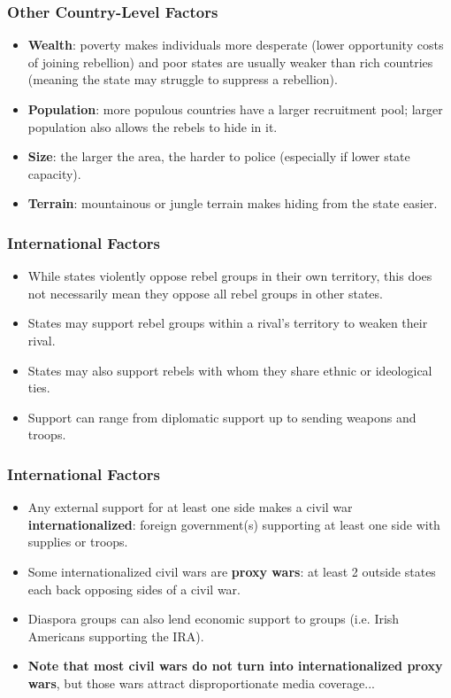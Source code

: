\documentclass{beamer}
\begin{document}
\begin{frame} 
\frametitle{\LARGE{Other Country-Level Factors}}
\begin{itemize}
		\item \textbf{Wealth}: poverty makes individuals more desperate (lower opportunity costs of joining rebellion) and poor states are usually weaker than rich countries (meaning the state may struggle to suppress a rebellion). \pause
		\item \textbf{Population}: more populous countries have a larger recruitment pool; larger population also allows the rebels to hide in it. \pause
		\item \textbf{Size}: the larger the area, the harder to police (especially if lower state capacity). \pause 
		\item \textbf{Terrain}: mountainous or jungle terrain makes hiding from the state easier.
\end{itemize}
\end{frame}

\begin{frame} 
	\frametitle{\LARGE{International Factors}}
	\begin{itemize}
		\item While states violently oppose rebel groups in their own territory, this does not necessarily mean they oppose all rebel groups in other states. \pause
		\item States may support rebel groups within a rival's territory to weaken their rival. \pause
		\item States may also support rebels with whom they share ethnic or ideological ties. \pause
		\item Support can range from diplomatic support up to sending weapons and troops. 
	\end{itemize}
\end{frame}

\begin{frame} 
\frametitle{\LARGE{International Factors}}
\begin{itemize}
		\item Any external support for at least one side makes a civil war \textbf{internationalized}: foreign government(s) supporting at least one side with supplies or troops. \pause
		\item Some internationalized civil wars are \textbf{proxy wars}: at least 2 outside states each back opposing sides of a civil war. \pause
		\item Diaspora groups can also lend economic support to groups (i.e. Irish Americans supporting the IRA).\pause
		\item \textbf{Note that most civil wars do not turn into internationalized proxy wars}, but those wars attract disproportionate media coverage...
\end{itemize}
\end{frame}
\end{document}
